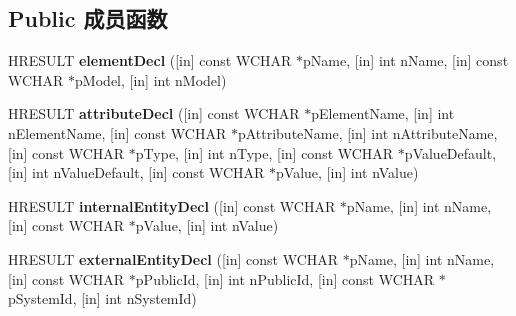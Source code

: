 \subsection*{Public 成员函数}
\begin{DoxyCompactItemize}
\item 
\mbox{\label{interface_m_s_x_m_l2_1_1_i_s_a_x_decl_handler_aa0b02d77df8f1251429a0a6ff0853368}} 
H\+R\+E\+S\+U\+LT {\bfseries element\+Decl} (\mbox{[}in\mbox{]} const W\+C\+H\+AR $\ast$p\+Name, \mbox{[}in\mbox{]} int n\+Name, \mbox{[}in\mbox{]} const W\+C\+H\+AR $\ast$p\+Model, \mbox{[}in\mbox{]} int n\+Model)
\item 
\mbox{\label{interface_m_s_x_m_l2_1_1_i_s_a_x_decl_handler_a578a102b31fca7f4aed40e2b3cbb293b}} 
H\+R\+E\+S\+U\+LT {\bfseries attribute\+Decl} (\mbox{[}in\mbox{]} const W\+C\+H\+AR $\ast$p\+Element\+Name, \mbox{[}in\mbox{]} int n\+Element\+Name, \mbox{[}in\mbox{]} const W\+C\+H\+AR $\ast$p\+Attribute\+Name, \mbox{[}in\mbox{]} int n\+Attribute\+Name, \mbox{[}in\mbox{]} const W\+C\+H\+AR $\ast$p\+Type, \mbox{[}in\mbox{]} int n\+Type, \mbox{[}in\mbox{]} const W\+C\+H\+AR $\ast$p\+Value\+Default, \mbox{[}in\mbox{]} int n\+Value\+Default, \mbox{[}in\mbox{]} const W\+C\+H\+AR $\ast$p\+Value, \mbox{[}in\mbox{]} int n\+Value)
\item 
\mbox{\label{interface_m_s_x_m_l2_1_1_i_s_a_x_decl_handler_a9ced085aa221826fda98e637e74dbab9}} 
H\+R\+E\+S\+U\+LT {\bfseries internal\+Entity\+Decl} (\mbox{[}in\mbox{]} const W\+C\+H\+AR $\ast$p\+Name, \mbox{[}in\mbox{]} int n\+Name, \mbox{[}in\mbox{]} const W\+C\+H\+AR $\ast$p\+Value, \mbox{[}in\mbox{]} int n\+Value)
\item 
\mbox{\label{interface_m_s_x_m_l2_1_1_i_s_a_x_decl_handler_a509bf7c25a580f3df2dd02fd59583dff}} 
H\+R\+E\+S\+U\+LT {\bfseries external\+Entity\+Decl} (\mbox{[}in\mbox{]} const W\+C\+H\+AR $\ast$p\+Name, \mbox{[}in\mbox{]} int n\+Name, \mbox{[}in\mbox{]} const W\+C\+H\+AR $\ast$p\+Public\+Id, \mbox{[}in\mbox{]} int n\+Public\+Id, \mbox{[}in\mbox{]} const W\+C\+H\+AR $\ast$p\+System\+Id, \mbox{[}in\mbox{]} int n\+System\+Id)
\item 
\mbox{\label{interface_m_s_x_m_l2_1_1_i_s_a_x_decl_handler_aa0b02d77df8f1251429a0a6ff0853368}} 

\end{DoxyCompactItemize}
